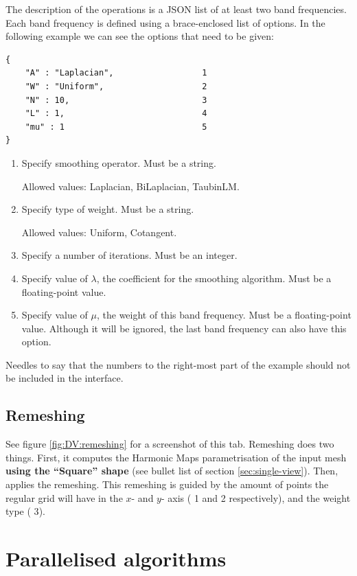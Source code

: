\documentclass[12pt]{article}
\newcommand \elem[1] {{\color{red} #1}}
\begin{document}
The description of the operations is a JSON list of at least two band
frequencies. Each band frequency is defined using a brace-enclosed list
of options. In the following example we can see the options that need to
be given:
\begin{verbatim}
{
    "A" : "Laplacian",                  1
    "W" : "Uniform",                    2
    "N" : 10,                           3
    "L" : 1,                            4
    "mu" : 1                            5
}
\end{verbatim}
\begin{enumerate}
	\item Specify smoothing operator. Must be a string.
	\hfill
	
	Allowed values: Laplacian, BiLaplacian, TaubinLM.
	\item Specify type of weight. Must be a string.
	\hfill
	
	Allowed values: Uniform, Cotangent.
	\item Specify a number of iterations. Must be an integer.
	\item Specify value of $\lambda$, the coefficient for the smoothing
	algorithm. Must be a floating-point value.
	\item Specify value of $\mu$, the weight of this band frequency.
	Must be a floating-point value. Although it will be ignored, the last
	band frequency can also have this option.
\end{enumerate}

Needles to say that the numbers to the right-most part of the example
should not be included in the interface.

\subsection{Remeshing}
\label{sec:dual-view:remeshing}

See figure \ref{fig:DV:remeshing} for a screenshot of this tab.
Remeshing does two things. First, it computes the Harmonic Maps parametrisation
of the input mesh \textbf{using the ``Square'' shape} (see bullet list of
section \ref{sec:single-view}). Then, applies the remeshing. This remeshing is
guided by the amount of points the regular grid will have in the $x$- and
$y$- axis (\elem{1} and \elem{2} respectively), and the weight type (\elem{3}).

\section{Parallelised algorithms}
\label{sec:parallel-algorithms}
\end{document}
